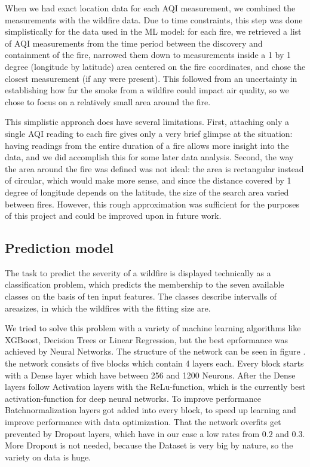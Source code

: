 \documentclass[a4paper,12pt]{article}
\begin{document}
When we had exact location data for each AQI measurement, we combined the measurements with the wildfire data. Due to time constraints, this step was done simplistically for the data used in the ML model: for each fire, we retrieved a list of AQI measurements from the time period between the discovery and containment of the fire, narrowed them down to measurements inside a 1 by 1 degree (longitude by latitude) area centered on the fire coordinates, and chose the closest measurement (if any were present). This followed from an uncertainty in establishing how far the smoke from a wildfire could impact air quality, so we chose to focus on a relatively small area around the fire.

This simplistic approach does have several limitations. First, attaching only a single AQI reading to each fire gives only a very brief glimpse at the situation: having readings from the entire duration of a fire allows more insight into the data, and we did accomplish this for some later data analysis. Second, the way the area around the fire was defined was not ideal: the area is rectangular instead of circular, which would make more sense, and since the distance covered by 1 degree of longitude depends on the latitude, the size of the search area varied between fires. However, this rough approximation was sufficient for the purposes of this project and could be improved upon in future work.

\subsection{Prediction model}

The task to predict the severity of a wildfire is displayed technically as a classification problem, which predicts the membership to the seven available classes on the basis of ten input features. The classes describe intervalls of areasizes, in which the wildfires with the fitting size are.

We tried to solve this problem with a variety of machine learning algorithms like XGBoost, Decision Trees or Linear Regression, but the best eprformance was achieved by Neural Networks.
The structure of the network can be seen in figure \cite{}.
the network consists of five blocks which contain 4 layers each. Every block starts with a Dense layer which have between 256 and 1200 Neurons. After the Dense layers follow Activation layers with the ReLu-function, which is the currently best activation-function for deep neural networks. 
To improve performance Batchnormalization layers got added into every block, to speed up learning and improve performance with data optimization. That the network overfits get prevented by Dropout layers, which have in our case a low rates from $0.2$ and $0.3$. More Dropout is not needed, because the Dataset is very big by nature, so the variety on data is huge.
\end{document}
